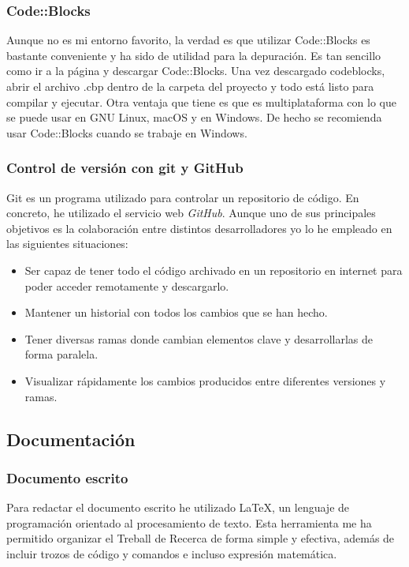\subsubsection{Code::Blocks}
Aunque no es mi entorno favorito, la verdad es que utilizar Code::Blocks es bastante conveniente y ha sido de utilidad para la depuración. Es tan sencillo como ir a la página y descargar Code::Blocks. Una vez descargado codeblocks, abrir el archivo .cbp dentro de la carpeta del proyecto y todo está listo para compilar y ejecutar. Otra ventaja que tiene es que es multiplataforma con lo que se puede usar en GNU Linux, macOS y en Windows. De hecho se recomienda usar Code::Blocks cuando se trabaje en Windows.

\subsubsection{Control de versión con git y GitHub}
Git es un programa utilizado para controlar un repositorio de código. En concreto, he utilizado el servicio web \textit{GitHub}. Aunque uno de sus principales objetivos es la colaboración entre distintos desarrolladores yo lo he empleado en las siguientes situaciones:
\begin{itemize}
\item{Ser capaz de tener todo el código archivado en un repositorio en internet para poder acceder remotamente y descargarlo.}
\item{Mantener un historial con todos los cambios que se han hecho.}
\item{Tener diversas ramas donde cambian elementos clave y desarrollarlas de forma paralela.}
\item{Visualizar rápidamente los cambios producidos entre diferentes versiones y ramas.}
\end{itemize}
\subsection{Documentación}
\subsubsection{Documento escrito}
Para redactar el documento escrito he utilizado \LaTeX, un lenguaje de programación orientado al procesamiento de texto. Esta herramienta me ha permitido organizar el Treball de Recerca de forma simple y efectiva, además de incluir trozos de código y comandos e incluso expresión matemática.
